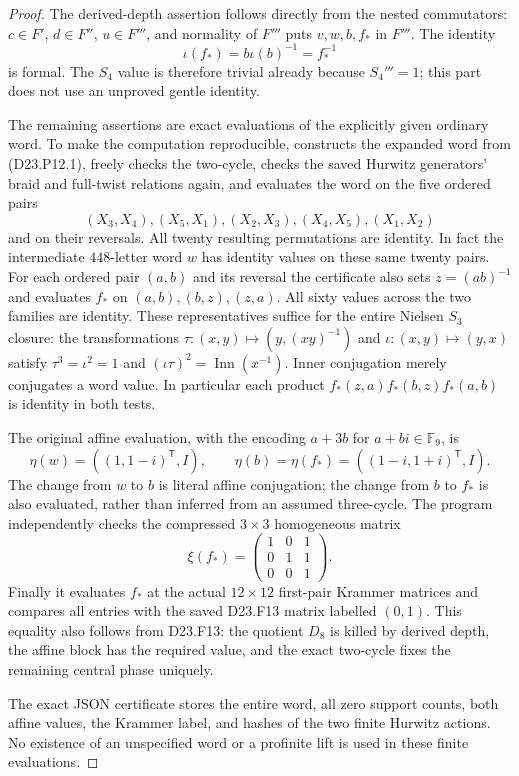 \begin{proof}
The derived-depth assertion follows directly from the nested
commutators: $c\in F'$, $d\in F''$, $u\in F'''$, and
normality of $F'''$ puts $v,w,b,f_*$ in $F'''$. The identity
\[
 \iota(f_*)=b\iota(b)^{-1}=f_*^{-1}
\]
is formal. The $S_4$ value is therefore trivial already because
$S_4'''=1$; this part does not use an unproved gentle identity.

The remaining assertions are exact evaluations of the explicitly
given ordinary word. To make the computation reproducible,
 constructs the
expanded word from (D23.P12.1), freely checks the two-cycle,
checks the saved Hurwitz generators' braid and full-twist
relations again, and evaluates the word on the five ordered pairs
\[
 (X_3,X_4),(X_5,X_1),(X_2,X_3),(X_4,X_5),(X_1,X_2)
\tag{D23.P12.3}
\]
and on their reversals. All twenty resulting permutations are
identity. In fact the intermediate $448$-letter word $w$ has
identity values on these same twenty pairs.
For each ordered pair $(a,b)$ and its reversal the certificate
also sets $z=(ab)^{-1}$ and evaluates $f_*$ on
$(a,b),(b,z),(z,a)$. All sixty values across the two families
are identity. These representatives suffice for the entire
Nielsen $S_3$ closure: the transformations
$\tau:(x,y)\mapsto(y,(xy)^{-1})$ and
$\iota:(x,y)\mapsto(y,x)$ satisfy
$\tau^3=\iota^2=1$ and $(\iota\tau)^2=\operatorname{Inn}(x^{-1})$.
Inner conjugation merely conjugates a word value. In particular
each product $f_*(z,a)f_*(b,z)f_*(a,b)$ is identity in both tests.

The original affine evaluation, with the encoding $a+3b$ for
$a+bi\in\mathbb F_9$, is
\[
 \eta(w)=((1,1-i)^{\mathsf T},I),\qquad
 \eta(b)=\eta(f_*)=((1-i,1+i)^{\mathsf T},I).
\]
The change from $w$ to $b$ is literal affine conjugation; the
change from $b$ to $f_*$ is also evaluated, rather than inferred
from an assumed three-cycle. The program independently checks
the compressed $3\times3$ homogeneous matrix
\[
 \xi(f_*)=\begin{pmatrix}1&0&1\\0&1&1\\0&0&1\end{pmatrix}.
\]
Finally it evaluates $f_*$ at the actual $12\times12$ first-pair
Krammer matrices and compares all entries with the saved
D23.F13 matrix labelled $(0,1)$. This equality also follows
from D23.F13: the quotient $D_8$ is killed by derived depth,
the affine block has the required value, and the exact two-cycle
fixes the remaining central phase uniquely.

The exact JSON certificate stores the entire word, all zero
support counts, both affine values, the Krammer label, and hashes
of the two finite Hurwitz actions. No existence of an unspecified
word or a profinite lift is used in these finite evaluations.
\end{proof}

